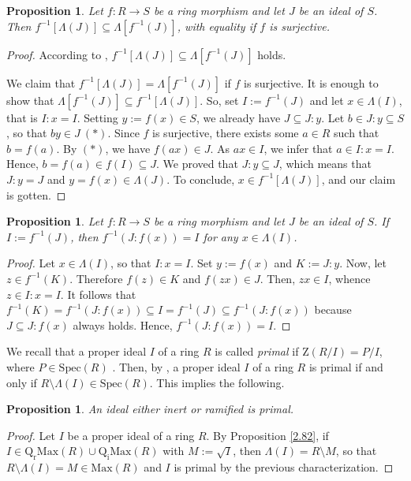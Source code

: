 \documentclass[12pt,leqno]{amsart}
\newtheorem{proposition}[theorem]{Proposition}
\theoremstyle{definition}
\begin{document}
\begin{proposition}\label{2.84} Let $f:R\to S$ be a ring morphism and let $ J$ be an ideal of $S$. Then $f^{-1}[\Lambda(J)]\subseteq\Lambda[f^{-1} (J)]$, with equality if $f$ is surjective.
\end{proposition}
\begin{proof} According to \cite[Corollaire, p.89]{PICANAL}, $f^{-1}[\Lambda(J)]\subseteq \Lambda[f^{-1}(J)]$ holds.

We claim that $f^{-1}[\Lambda(J)]=\Lambda[f^{-1}(J)]$ if $f$ is surjective. It is enough to show that $\Lambda[f^{-1}(J)]\subseteq f^{-1}[\Lambda(J)]$. So, set $I:=f^{-1}(J)$ and let $x\in\Lambda(I)$, that is $I:x=I$. Setting $y:=f (x)\in S$, we already have $J\subseteq J:y$. Let $b\in J:y\subseteq S$, so that $by\in J\ (*)$. Since $f$ is surjective, there exists some $a\in R$ such that $b =f(a)$. By $(*)$, we have $f(ax)\in J$. As $ax\in I$, we infer that $a\in I:x=I$. Hence, $b=f(a)\in f(I)\subseteq J$. We proved that $J:y\subseteq J$, which means that $J:y=J$ and $y=f(x)\in\Lambda(J)$. To conclude, $x\in f^{-1}[\Lambda(J)]$, and our claim is gotten. 
\end{proof}

\begin{proposition}\label{2.85} Let $f:R\to S$ be a ring morphism and let $  J$ be an ideal of $S$. If $I:=f^{-1}(J)$, then $f^{-1}(J:f(x))=I$ for any $x\in\Lambda(I)$.
\end{proposition}
\begin{proof} Let $x\in\Lambda(I)$, so that $I:x=I$. Set $y:=f(x)$ and $K:= J:y$. Now, let $z\in f^{-1}(K)$. Therefore  $f(z)\in K$ and $f(zx)\in J$. Then, $zx\in I$, whence $z\in I:x=I$. It follows that $f^{-1}(K)=f^{-1}(J:f(x))\subseteq I=f^{-1}(J)\subseteq f^{-1}(J:f(x))$ because $J\subseteq J:f(x)$ always holds. Hence, $f^{-1}(J:f(x))=I$.
\end{proof}

We recall that a proper ideal $I$ of a ring $R$ is called {\it primal} if $\mathrm Z(R/I)=P/I$, where $P\in\mathrm{Spec}(R)$ \cite[Ch. IV, Exercice 33, p.177]{ALCO1}. Then, by \cite[Corollaire, p.83]{PICANAL}, a proper ideal $I$ of a ring $R$ is primal if and only if $R\setminus \Lambda(I)\in\mathrm{Spec}(R)$. This implies the following.

\begin{proposition}\label{2.87} An ideal either inert or ramified is primal.\end{proposition}
\begin{proof} Let $I$ be a proper ideal of a ring $R$. By Proposition \ref{2.82}, if $I\in\mathrm{Q_rMax}(R)\cup\mathrm{Q_iMax}(R)$ with $M:=\sqrt I$, then $\Lambda(I)=R\setminus M$, so that $R\setminus\Lambda(I) =M\in\mathrm{Max}(R)$ and $I$ is primal by the previous characterization. 
\end{proof}
\end{document}
